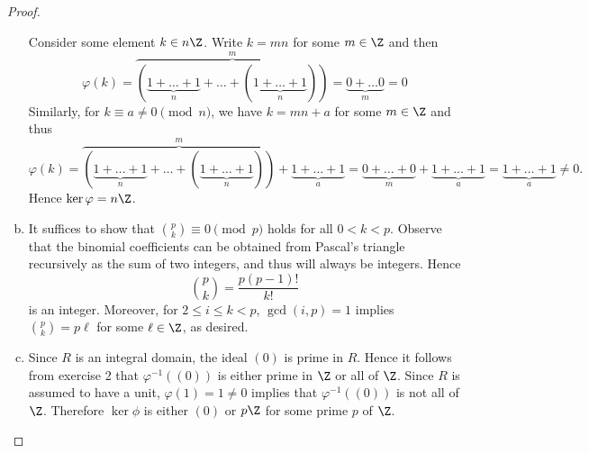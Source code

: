 \documentclass[10pt]{amsart}
\begin{document}
\begin{thm}
\begin{proof}
\begin{enumerate}[(a)]
        Consider some element $k \in n\Z$.  
        Write $k = mn$ for some $m \in \Z$ and then
        $$\varphi(k) = \overbrace{(\underbrace{1 + \ldots + 1}_n + \ldots + (\underbrace{1 + \ldots + 1}_n))}^m = \underbrace{0 + \ldots 0}_m = 0$$
        Similarly, for $k \equiv a \neq 0 \pmod{n}$, we have $k = mn + a$ for some $m \in \Z$ and thus
        $$\varphi(k) = \overbrace{(\underbrace{1 + \ldots + 1}_n + \ldots + (\underbrace{1 + \ldots + 1}_n))}^m +\underbrace{1 + \ldots + 1}_a = \underbrace{0 + \ldots + 0}_m + \underbrace{1 + \ldots + 1}_a = \underbrace{1 + \ldots + 1}_a \neq 0.$$
        Hence $\ker\varphi = n\Z$.
      \item
        It suffices to show that ${p \choose k} \equiv 0 \pmod{p}$ holds for all $0 < k < p$.
        Observe that the binomial coefficients can be obtained from Pascal's triangle recursively as the sum of two integers, and thus will always be integers.
        Hence
        $${p \choose k} = \frac{p(p-1)!}{k!}$$
        is an integer.
        Moreover, for $2 \leq i \leq k < p$, $\gcd(i,p) = 1$ implies ${p \choose k} = p\ell$ for some $\ell \in \Z$, as desired.
      \item
        Since $R$ is an integral domain, the ideal $(0)$ is prime in $R$.
        Hence it follows from exercise 2 that $\varphi^{-1}((0))$ is either prime in $\Z$ or all of $\Z$.
        Since $R$ is assumed to have a unit, $\varphi(1) = 1 \neq 0$ implies that $\varphi^{-1}((0))$ is not all of $\Z$.
        Therefore $\ker\phi$ is either $(0)$ or $p\Z$ for some prime $p$ of $\Z$.
    \end{enumerate}
  \end{proof}
\end{thm}  
\end{document}
